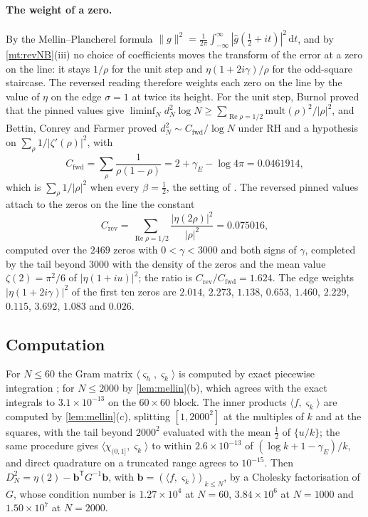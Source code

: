 \documentclass[11pt]{article}
\theoremstyle{definition}\newtheorem{definition}[theorem]{Definition}
\theoremstyle{remark}\newtheorem{remark}[theorem]{Remark}
\theoremstyle{definition}\newtheorem{axiom}{Axiom}
\newcommand{\dd}{\,\mathrm d}\newcommand{\e}{\mathrm e}
\renewcommand{\Re}{\operatorname{Re}}\renewcommand{\Im}{\operatorname{Im}}
\newcommand{\fr}[1]{\{#1\}}
\begin{document}
\paragraph{The weight of a zero.} By the Mellin--Plancherel formula $\|g\|^2=\frac1{2\pi}\int_{-\infty}^\infty|\hat g(\frac12+it)|^2\dd t$, and by \cref{mt:revNB}(iii) no choice of coefficients moves the transform of the error at a zero on the line: it stays $1/\rho$ for the unit step and $\eta(1+2i\gamma)/\rho$ for the odd-square staircase. The reversed reading therefore weights each zero on the line by the value of $\eta$ on the edge $\sigma=1$ at twice its height. For the unit step, Burnol \cite{Burnol} proved that the pinned values give $\liminf_Nd_N^2\log N\ge\sum_{\Re\rho=1/2}\mathrm{mult}(\rho)^2/|\rho|^2$, and Bettin, Conrey and Farmer \cite{BCF} proved $d_N^2\sim C_{\mathrm{fwd}}/\log N$ under RH and a hypothesis on $\sum_\rho1/|\zeta'(\rho)|^2$, with
\[
C_{\mathrm{fwd}}=\sum_\rho\frac1{\rho(1-\rho)}=2+\gamma_E-\log4\pi=0.0461914,
\]
which is $\sum_\rho1/|\rho|^2$ when every $\beta=\frac12$, the setting of \cite{BCF}. The reversed pinned values attach to the zeros on the line the constant
\[
C_{\mathrm{rev}}=\sum_{\Re\rho=1/2}\frac{|\eta(2\rho)|^2}{|\rho|^2}=0.075016,
\]
computed over the $2469$ zeros with $0<\gamma<3000$ and both signs of $\gamma$, completed by the tail beyond $3000$ with the density of the zeros and the mean value $\zeta(2)=\pi^2/6$ of $|\eta(1+iu)|^2$; the ratio is $C_{\mathrm{rev}}/C_{\mathrm{fwd}}=1.624$. The edge weights $|\eta(1+2i\gamma)|^2$ of the first ten zeros are $2.014$, $2.273$, $1.138$, $0.653$, $1.460$, $2.229$, $0.115$, $3.692$, $1.083$ and $0.026$.

\subsection{Computation}

For $N\le60$ the Gram matrix $\langle\varsigma_h,\varsigma_k\rangle$ is computed by exact piecewise integration \cite{S10}; for $N\le2000$ by \cref{lem:mellin}(b), which agrees with the exact integrals to $3.1\times10^{-13}$ on the $60\times60$ block. The inner products $\langle f,\varsigma_k\rangle$ are computed by \cref{lem:mellin}(c), splitting $[1,2000^2]$ at the multiples of $k$ and at the squares, with the tail beyond $2000^2$ evaluated with the mean $\frac12$ of $\fr{u/k}$; the same procedure gives $\langle\chi_{(0,1]},\varsigma_k\rangle$ to within $2.6\times10^{-13}$ of $(\log k+1-\gamma_E)/k$, and direct quadrature on a truncated range agrees to $10^{-15}$. Then $D_N^2=\eta(2)-\mathbf b^{\mathsf T}G^{-1}\mathbf b$, with $\mathbf b=(\langle f,\varsigma_k\rangle)_{k\le N}$, by a Cholesky factorisation of $G$, whose condition number is $1.27\times10^4$ at $N=60$, $3.84\times10^6$ at $N=1000$ and $1.50\times10^7$ at $N=2000$.
\end{document}

